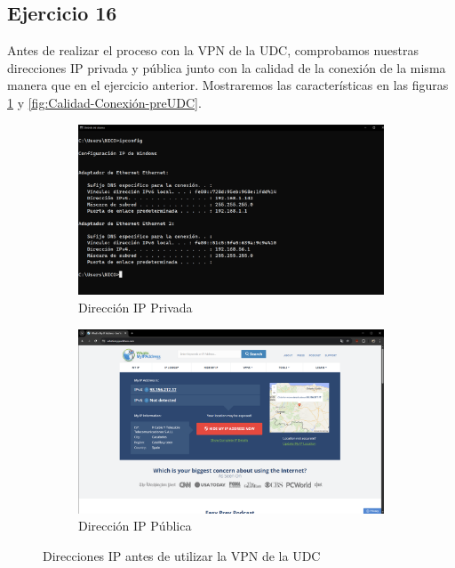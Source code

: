 \subsection{Ejercicio 16}
\graphicspath{ {img/16} }


Antes de realizar el proceso con la VPN de la UDC, comprobamos nuestras direcciones IP privada y pública junto con la calidad de la conexión de la misma manera que en el ejercicio anterior. Mostraremos las características en las figuras \ref{fig:IPs-preUDC} y \ref{fig:Calidad-Conexión-preUDC}.

\begin{figure}[H]
    \centering
    \begin{subfigure}{.5\textwidth}
        \centering
        \includegraphics[width=\linewidth]{IP-Privada-preUDC.png}
        \caption{Dirección IP Privada}
    \end{subfigure}%
    \begin{subfigure}{.5\textwidth}
        \centering
        \includegraphics[width=\linewidth]{IP-Publica-preUDC.png}
        \caption{Dirección IP Pública}
    \end{subfigure}
    \caption{Direcciones IP antes de utilizar la VPN de la UDC}
    \label{fig:IPs-preUDC}
\end{figure}


